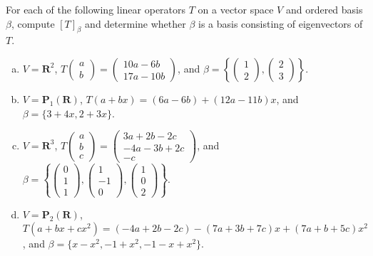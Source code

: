 \documentclass[a4paper,11pt]{article}
\newcommand{\R}{\mathbf{R}}
\newcommand{\PP}{\mathbf{P}}
\begin{document}
 For each of the following linear operators $T$ on
a vector space $V$ and ordered basis $\beta$, compute $[T]_\beta$ and determine
whether $\beta$ is a basis consisting of eigenvectors of $T$.
\begin{enumerate}[(a)]
\item $V=\R^2$,
  $T\left( \begin{smallmatrix}a\\b\end{smallmatrix} \right)=
  \left( \begin{smallmatrix}10a-6b\\17a-10b\end{smallmatrix} \right)$,
  and
  $\beta=\left\{ \left( \begin{smallmatrix}1\\2\end{smallmatrix} \right),
  \left( \begin{smallmatrix}2\\3\end{smallmatrix} \right)\right\}$.

\item $V=\PP_1(\R)$, $T(a+bx)=(6a-6b)+(12a-11b)x$, and $\beta=\{3+4x, 2+3x\}$.
  
\item $V=\R^3$,
  $T\left( \begin{smallmatrix}a\\b\\c\end{smallmatrix} \right)=
  \left( \begin{smallmatrix}3a+2b-2c\\-4a-3b+2c\\-c\end{smallmatrix} \right)$,
  and
  $\beta=\left\{ \left( \begin{smallmatrix}0\\1\\1\end{smallmatrix} \right),
    \left( \begin{smallmatrix}1\\-1\\0\end{smallmatrix} \right),
  \left( \begin{smallmatrix}1\\0\\2\end{smallmatrix} \right)\right\}$.

\item $V=\PP_2(\R)$, $T(a+bx+cx^2)=(-4a+2b-2c)-(7a+3b+7c)x+(7a+b+5c)x^2$, and
  $\beta=\{x-x^2,-1+x^2,-1-x+x^2\}$.


\end{enumerate}
\end{document}
